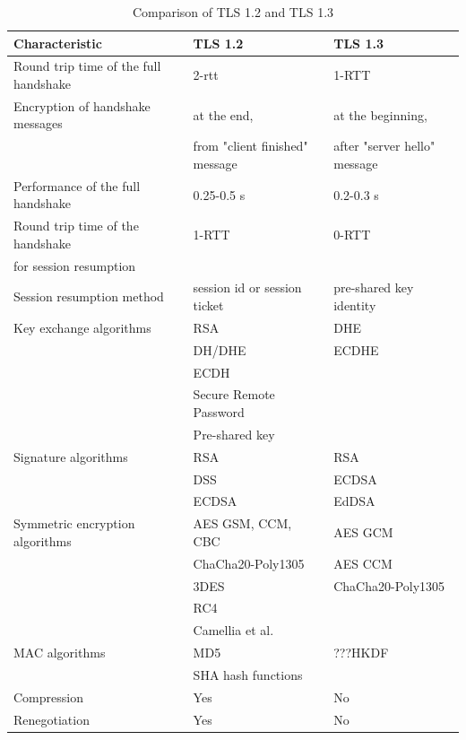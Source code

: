 \begin{table}[H]
	\centering
		\begin{tabular}{lll} \toprule
			\textbf{Characteristic} & \textbf{TLS 1.2} & \textbf{TLS 1.3} \\ \midrule
			Round trip time of the full handshake & 2-\gls{rtt} & 1-RTT \\ \midrule
			Encryption of handshake messages & at the end, & at the beginning, \\ 
			& from "client finished" message & after "server hello" message \\ \midrule
			Performance of the full handshake & 0.25-0.5 s & 0.2-0.3 s\\ \midrule
			Round trip time of the handshake & 1-RTT & 0-RTT \\ 
			for session resumption \\ \midrule
			Session resumption method & session id or session ticket & pre-shared key identity \\ \midrule
			Key exchange algorithms & RSA & DHE\\ 
			& DH/DHE & ECDHE\\
			& ECDH \\
			& Secure Remote Password \\
			& Pre-shared key \\ \midrule
			Signature algorithms & RSA & RSA\\
			& DSS & ECDSA\\
			& ECDSA & EdDSA \\ \midrule
			Symmetric encryption algorithms & AES GSM, CCM, CBC  & AES GCM\\
			& ChaCha20-Poly1305 & AES CCM \\
			& 3DES & ChaCha20-Poly1305 \\
			& RC4 \\
			& Camellia et al.\\ \midrule
			MAC algorithms & MD5 & ???HKDF\\
			& SHA hash functions \\ \midrule
			Compression & Yes & No \\ \midrule
			Renegotiation & Yes & No \\ \midrule
			

		\end{tabular}
	\caption{Comparison of TLS 1.2 and TLS 1.3}
	\label{tab:comparison}
\end{table}

